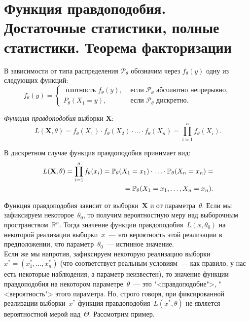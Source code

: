 \section{Функция правдоподобия. Достаточные статистики, полные статистики. Теорема факторизации}

В зависимости от типа распределения $\mathcal{P}_\theta$ обозначим через $f_{\theta}(y)$ одну из следующих функций:
\begin{equation*}
    f_{\theta}(y) =
    \left\{\begin{array}{ll}
    \text { плотность } f_{\theta}(y), & \text { если } \mathcal{P}_{\theta} \text { абсолютно непрерывно, } \\
    P_{\theta}\left(X_{1}=y\right), & \text { если } \mathcal{P}_{\theta} \text { дискретно. }
    \end{array}\right.
\end{equation*}

\begin{defn}
    \textit{Функция правдоподобия} выборки $\mathbf{X}$:
    \begin{equation*}
        L(\mathbf{X} , \theta)=f_{\theta}\left(X_{1}\right) \cdot f_{\theta}\left(X_{2}\right) \cdot \ldots \cdot f_{\theta}\left(X_{n}\right)=\prod_{i=1}^{n} f_{\theta}\left(X_{i}\right).
    \end{equation*}
\end{defn}

В дискретном случае функция правдоподобия принимает вид:
\begin{equation*}
    \begin{aligned}
        L(\mathbf{X} , \theta)=\prod_{i=1}^{n} f_{\theta}(x_{i}) 
        = \mathbb{P}_{\theta} (X_{1}=x_{1}) \cdot \ldots \cdot \mathbb{P}_{\theta} (X_{n}=x_{n}) = \\
        = \mathbb{P}_{\theta} (X_{1}=x_{1}, \ldots, X_{n}=x_{n}).
    \end{aligned}
\end{equation*}

\begin{rmrk}
    Функция правдоподобия зависит от выборки~$\mathbf{X}$ и от параметра~$\theta$.
    Если мы зафиксируем некоторое~$\theta_0$, то получим вероятностную меру над выборочным пространством~$\mathbb{R}^n$.
    Тогда значение функции правдоподобия~$L(x, \theta_0)$ на некоторой реализации выборки~$x$~--- это вероятность этой реализации в предположении, что параметр~$\theta_0$~--- истинное значение. \\
    Если же мы напротив, зафиксируем некоторую реализацию выборки~${x^* = (x_1^*, \ldots, x_n^*)}$ (что соответствует реальным условиям~--- как правило, у нас есть некоторые наблюдения, а параметр неизвестен), то значение функции правдоподобия на некотором параметре~$\theta$~--- это "<правдоподобие">, "<вероятность"> этого параметра.
    Но, строго говоря, при фиксированной реализации выборки~$x^*$ функция правдоподобия~$L(x^*, \theta)$ не является вероятностной мерой над~$\Theta$.
    Рассмотрим пример.
\end{rmrk}

